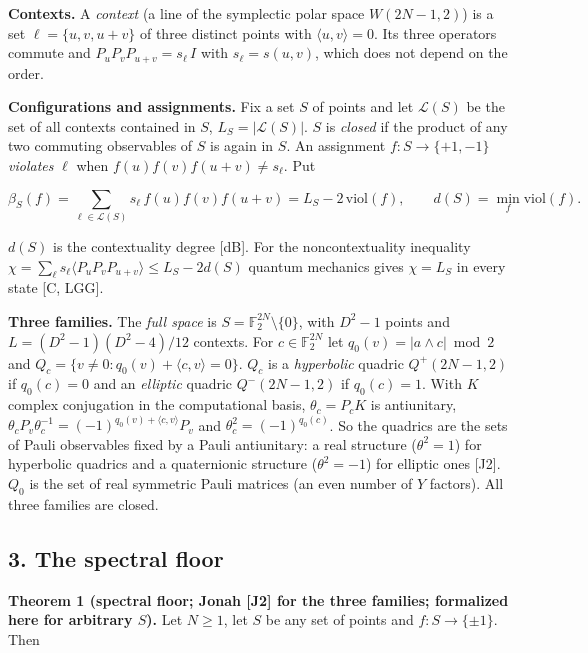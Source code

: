 \documentclass[11pt,a4paper]{article}
\begin{document}
\textbf{Contexts.} A \emph{context} (a line of the symplectic polar space \(W(2N-1,2)\)) is a set
\(\ell = \{u, v, u+v\}\) of three distinct points with \(\langle u, v\rangle = 0\). Its three operators commute and
\(P_u P_v P_{u+v} = s_\ell\, I\) with \(s_\ell = s(u,v)\), which does not depend on the order.

\textbf{Configurations and assignments.} Fix a set \(S\) of points and let \(\mathcal{L}(S)\) be the set of all
contexts contained in \(S\), \(L_S = |\mathcal{L}(S)|\). \(S\) is \emph{closed} if the product of any two commuting
observables of \(S\) is again in \(S\). An assignment \(f : S \to \{+1,-1\}\) \emph{violates}
\(\ell\) when \(f(u) f(v) f(u+v) \neq s_\ell\). Put

\[\beta_S(f) = \sum_{\ell \in \mathcal{L}(S)} s_\ell\, f(u) f(v) f(u+v) = L_S - 2\,\mathrm{viol}(f),
\qquad d(S) = \min_f \mathrm{viol}(f).\]

\(d(S)\) is the contextuality degree {[}dB{]}. For the noncontextuality inequality
\(\chi = \sum_\ell s_\ell \langle P_u P_v P_{u+v}\rangle \le L_S - 2 d(S)\) quantum mechanics gives
\(\chi = L_S\) in every state {[}C, LGG{]}.

\textbf{Three families.} The \emph{full space} is \(S = \mathbb{F}_2^{2N}\setminus\{0\}\), with \(D^2-1\) points
and \(L = (D^2-1)(D^2-4)/12\) contexts. For \(c \in \mathbb{F}_2^{2N}\) let \(q_0(v) = |a\wedge c| \bmod 2\) and
\(Q_c = \{ v \ne 0 : q_0(v) + \langle c, v\rangle = 0\}\). \(Q_c\) is a \emph{hyperbolic} quadric \(Q^+(2N-1,2)\) if
\(q_0(c) = 0\) and an \emph{elliptic} quadric \(Q^-(2N-1,2)\) if \(q_0(c) = 1\). With \(K\) complex conjugation in the
computational basis, \(\theta_c = P_c K\) is antiunitary, \(\theta_c P_v \theta_c^{-1} = (-1)^{q_0(v) + \langle c,v\rangle} P_v\)
and \(\theta_c^2 = (-1)^{q_0(c)}\). So the quadrics are the sets of Pauli observables fixed by a Pauli
antiunitary: a real structure (\(\theta^2 = 1\)) for hyperbolic quadrics and a quaternionic structure
(\(\theta^2 = -1\)) for elliptic ones {[}J2{]}. \(Q_0\) is the set of real symmetric Pauli matrices (an even
number of \(Y\) factors). All three families are closed.

\subsection{3. The spectral floor}\label{3-the-spectral-floor}

\textbf{Theorem 1 (spectral floor; Jonah {[}J2{]} for the three families; formalized here for arbitrary \(S\)).}
Let \(N \ge 1\), let \(S\) be any set of points and \(f : S \to \{\pm 1\}\). Then
\end{document}
